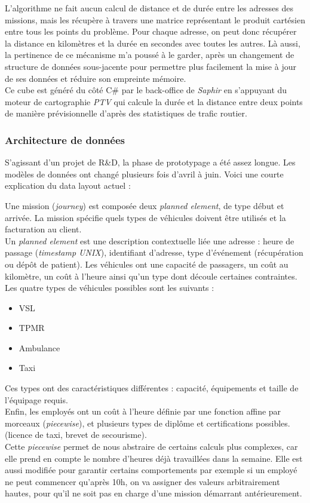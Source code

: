 \documentclass[french, 11pt]{memoir}
\begin{document}
L'algorithme ne fait aucun calcul de distance et de durée entre les
adresses des missions, mais les récupère à travers une matrice
représentant le produit cartésien entre tous les points du problème.
Pour chaque adresse, on peut donc récupérer la distance en kilomètres et
la durée en secondes avec toutes les autres. Là aussi, la pertinence de
ce mécanisme m'a poussé à le garder, après un changement de structure de
données sous-jacente pour permettre plus facilement la mise à jour de
ses données et réduire son empreinte mémoire. \\
Ce cube est généré du côté
C\# par le back-office de \emph{Saphir} en s'appuyant du moteur de
cartographie \emph{PTV} qui calcule la durée et la distance entre deux
points de manière prévisionnelle d'après des statistiques de trafic
routier.

\subsubsection{Architecture de
données}\label{architecture-de-donnuxe9es}

S'agissant d'un projet de R\&D, la phase de prototypage a été assez
longue. Les modèles de données ont changé plusieurs fois d'avril à juin.
Voici une courte explication du data layout actuel :

\bigskip
Une mission (\emph{journey}) est composée deux \textit{planned element},
de type début et arrivée. La mission spécifie quels types de véhicules
doivent être utilisés et la facturation au client. \\
Un \textit{planned element}
est une description contextuelle liée une adresse : heure de passage
(\emph{timestamp UNIX}), identifiant d'adresse, type d'événement
(récupération ou dépôt de patient). Les véhicules ont une capacité de
passagers, un coût au kilomètre, un coût à l'heure ainsi qu'un type dont
découle certaines contraintes. Les quatre types de véhicules possibles
sont les suivants :

\begin{itemize}
\item
  VSL
\item
  TPMR
\item
  Ambulance
\item
  Taxi
\end{itemize}

\bigskip
Ces types ont des caractéristiques différentes : capacité, équipements
et taille de l'équipage requis. \\
Enfin, les employés ont un coût à l'heure définie par une fonction affine
par morceaux (\emph{piecewise}), et plusieurs types de diplôme et
certifications possibles. (licence de taxi, brevet de secourisme). \\
Cette \textit{piecewise} permet de nous abstraire de certains calculs plus
complexes, car elle prend en compte le nombre d'heures déjà travaillées
dans la semaine. Elle est aussi modifiée pour garantir certains
comportements par exemple si un employé ne peut commencer qu'après 10h,
on va assigner des valeurs arbitrairement hautes, pour qu'il ne soit pas
en charge d'une mission démarrant antérieurement.
\end{document}

